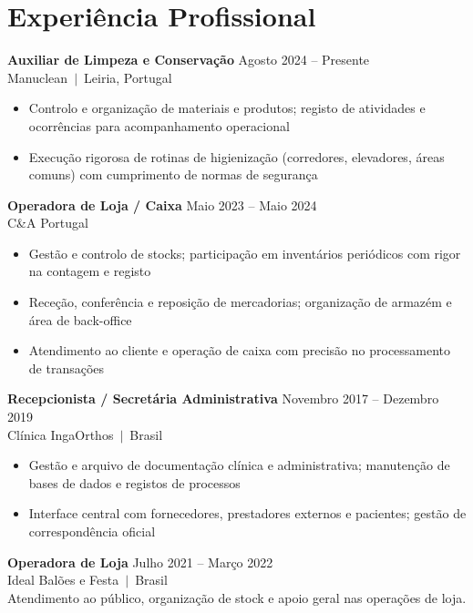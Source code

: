 \documentclass[10pt,a4paper]{article}
\begin{document}
\section{Experiência Profissional}

{\small\bfseries Auxiliar de Limpeza e Conservação}\hfill{\small\color{subtle} Agosto 2024 -- Presente}\\
{\small\color{accent} Manuclean~$|$~Leiria, Portugal}
\begin{itemize}\small
  \item Controlo e organização de materiais e produtos; registo de atividades e ocorrências para acompanhamento operacional
  \item Execução rigorosa de rotinas de higienização (corredores, elevadores, áreas comuns) com cumprimento de normas de segurança
\end{itemize}

\vspace{4pt}
{\small\bfseries Operadora de Loja / Caixa}\hfill{\small\color{subtle} Maio 2023 -- Maio 2024}\\
{\small\color{accent} C\&A Portugal}
\begin{itemize}\small
  \item Gestão e controlo de stocks; participação em inventários periódicos com rigor na contagem e registo
  \item Receção, conferência e reposição de mercadorias; organização de armazém e área de back-office
  \item Atendimento ao cliente e operação de caixa com precisão no processamento de transações
\end{itemize}

\vspace{4pt}
{\small\bfseries Recepcionista / Secretária Administrativa}\hfill{\small\color{subtle} Novembro 2017 -- Dezembro 2019}\\
{\small\color{accent} Clínica IngaOrthos~$|$~Brasil}
\begin{itemize}\small
  \item Gestão e arquivo de documentação clínica e administrativa; manutenção de bases de dados e registos de processos
  \item Interface central com fornecedores, prestadores externos e pacientes; gestão de correspondência oficial
\end{itemize}

\vspace{4pt}
{\small\bfseries Operadora de Loja}\hfill{\small\color{subtle} Julho 2021 -- Março 2022}\\
{\small\color{accent} Ideal Balões e Festa~$|$~Brasil}\\
{\small Atendimento ao público, organização de stock e apoio geral nas operações de loja.}
\end{document}
